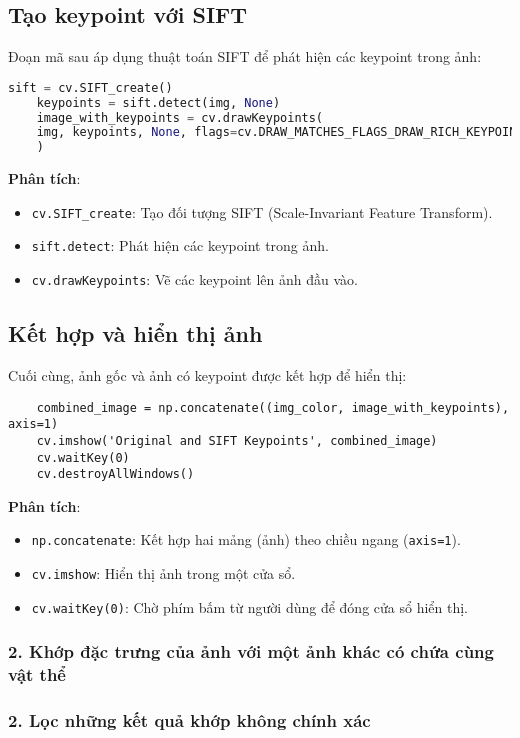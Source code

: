 \subsection{Tạo keypoint với SIFT}
Đoạn mã sau áp dụng thuật toán SIFT để phát hiện các keypoint trong ảnh:

\begin{lstlisting}[language=Python]
	sift = cv.SIFT_create()
	keypoints = sift.detect(img, None)
	image_with_keypoints = cv.drawKeypoints(
	img, keypoints, None, flags=cv.DRAW_MATCHES_FLAGS_DRAW_RICH_KEYPOINTS
	)
\end{lstlisting}

\textbf{Phân tích}:
\begin{itemize}
	\item \texttt{cv.SIFT\_create}: Tạo đối tượng SIFT (Scale-Invariant Feature Transform).
	\item \texttt{sift.detect}: Phát hiện các keypoint trong ảnh.
	\item \texttt{cv.drawKeypoints}: Vẽ các keypoint lên ảnh đầu vào.
\end{itemize}

\subsection{Kết hợp và hiển thị ảnh}
Cuối cùng, ảnh gốc và ảnh có keypoint được kết hợp để hiển thị:

\begin{lstlisting}
	combined_image = np.concatenate((img_color, image_with_keypoints), axis=1)
	cv.imshow('Original and SIFT Keypoints', combined_image)
	cv.waitKey(0)
	cv.destroyAllWindows()
\end{lstlisting}

\textbf{Phân tích}:
\begin{itemize}
	\item \texttt{np.concatenate}: Kết hợp hai mảng (ảnh) theo chiều ngang (\texttt{axis=1}).
	\item \texttt{cv.imshow}: Hiển thị ảnh trong một cửa sổ.
	\item \texttt{cv.waitKey(0)}: Chờ phím bấm từ người dùng để đóng cửa sổ hiển thị.
\end{itemize}

\subsubsection*{2. Khớp đặc trưng của ảnh với một ảnh khác có chứa cùng vật thể}
\subsubsection*{2. Lọc những kết quả khớp không chính xác}


